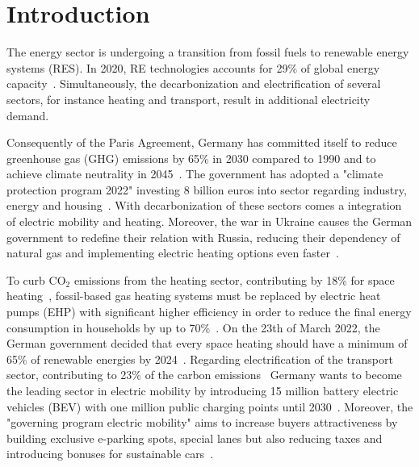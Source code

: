 
\chapter{Introduction}

The energy sector is undergoing a transition from fossil fuels to renewable energy systems (RES). In 2020, RE technologies %
accounts for 29\% of global energy capacity~\cite{IEA_2021}.
Simultaneously, the decarbonization and electrification of several sectors, for instance heating and transport, result in additional electricity demand. 

Consequently of the Paris Agreement, Germany has committed itself to reduce greenhouse gas (GHG) emissions by 65\% in 2030 compared to 1990 and to achieve climate neutrality in 2045~\cite{bmwk_klimaschutzpolitik}. The government has adopted a "climate protection program 2022" investing 8 billion euros into sector regarding industry, energy and housing~\cite{bmwk_klimaschutzpolitik}. With decarbonization of these sectors comes a integration of electric mobility and heating. Moreover, the war in Ukraine causes the German government to redefine their relation with Russia, reducing their dependency of natural gas and implementing electric heating options even faster~\cite{ukraine}. 

To curb CO$_2$ emissions from the heating sector, contributing by 18\% for space heating~\cite{agora_wärmewende},
fossil-based gas heating systems must be replaced by electric heat pumps (EHP) with significant higher efficiency in order to reduce the final energy consumption in households by up to 70\%~\cite{Gupta_Pena-Bello_Streicher_Roduner_Farhat_Thöni_Patel_Parra_2021}.
On the 23th of March 2022, the German government decided that every space heating should have a minimum of 65\% of renewable energies by 2024~\cite{Öko-InstitutundFraunhoferISE_2020}.
Regarding electrification of the transport sector, contributing to 23\% of the carbon emissions~\cite{co2transport}
Germany wants to become the leading sector in electric mobility by introducing 15 million battery electric vehicles (BEV) with one million public charging points until 2030~\cite{Bmwk_eautos}. Moreover, the "governing program electric mobility" aims to increase buyers attractiveness by building exclusive e-parking spots, special lanes but also reducing taxes and introducing bonuses for sustainable cars~\cite{Bmwk_eautos}.

